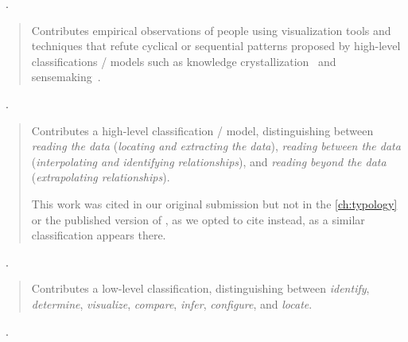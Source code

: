 \begin{sloppypar}
~\cite{Isenberg2008a}. \end{sloppypar}

\begin{quotation}
    Contributes empirical observations of people using visualization tools and techniques that refute cyclical or sequential patterns proposed by high-level classifications / models such as knowledge crystallization~\cite{Card1999} and sensemaking~\cite{Pirolli2005}.
\end{quotation}

\begin{sloppypar}
~\cite{Mayr2010}. \end{sloppypar}

\begin{quotation}
    Contributes a high-level classification / model, distinguishing between {\it reading the data} ({\it locating and extracting the data}), {\it reading between the data} ({\it interpolating and identifying relationships}), and {\it reading beyond the data} ({\it extrapolating relationships}).
    
    This work was cited in our original submission but not in the \autoref{ch:typology} or the published version of \citet{Brehmer2013}, as we opted to cite \citet{Friel2001} instead, as a similar classification appears there.
\end{quotation}

\begin{sloppypar}
~\cite{Valiati2006}. \end{sloppypar}

\begin{quotation}
    Contributes a low-level classification, distinguishing between {\it identify}, {\it determine}, {\it visualize}, {\it compare}, {\it infer}, {\it configure}, and {\it locate}.
\end{quotation}

\begin{sloppypar}
~\cite{Perer2009}. \end{sloppypar}

